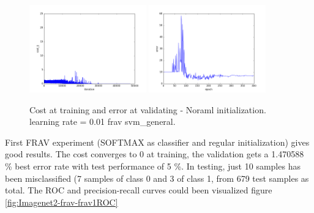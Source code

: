 \begin{figure}[htb]
\centering
\includegraphics[width=0.45\textwidth]{images/FRAv_casia_ImageNet/Imagenet2/frav/svm_general/cost.png}
\includegraphics[width=0.45\textwidth]{images/FRAv_casia_ImageNet/Imagenet2/frav/svm_general/error.png}
\caption{Cost at training and error at validating - Noraml initialization. learning rate = 0.01 frav svm\_general.} \label{fig:Imagenet2-frav-svm_general}
\end{figure}


First FRAV experiment (SOFTMAX as classifier and regular initialization) gives good results. The cost converges to 0 at training, the validation gets a 1.470588 \% best error rate with test performance of 5 \%. In testing, just 10 samples has been misclassified (7 samples of class 0 and 3 of class 1, from 679 test samples as total. The ROC  and precision-recall curves could been visualized figure \ref{fig:Imagenet2-frav-frav1ROC}\\

